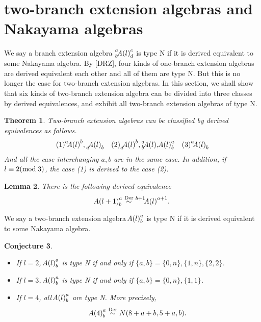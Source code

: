 \documentclass[a4paper, reqno]{amsart}
\newtheorem{thm}{Theorem}[section]
\newtheorem{conj}[thm]{Conjecture}
\newtheorem{lem}[thm]{Lemma}
\theoremstyle{definition}
\theoremstyle{remark}
\numberwithin{equation}{section}
\begin{document}
\section{two-branch extension algebras and Nakayama algebras}

We say a branch extension algebra ${\vphantom{A(l)}}^{a}_{b}\negmedspace{A(l)}^{c}_{d}$ is type N if it is derived equivalent to some Nakayama algebra. By [DRZ], four kinds of one-branch extension algebras are derived equivalent each other and all of them are type N. But this is no longer the case for two-branch extension algebras. In this section, we shall show that six kinds of two-branch extension algebra can be divided into three classes by derived equivalences, and exhibit all two-branch extension algebras of type N.
 
\begin{thm}
Two-branch extension algebras can be classified by derived equivalences as follows.
$$\begin{array}{lll}
(1) {\vphantom{A(l)}}^{a}\negmedspace{A(l)}^{b},{\vphantom{A(l)}}_{a}\negmedspace{A(l)}_{b} & (2) {\vphantom{A(l)}}_{a}\negmedspace{A(l)}^{b},{\vphantom{A(l)}}^{a}_{b}\negmedspace{A(l)},{\vphantom{A(l)}}\negmedspace{A(l)}^{a}_{b} & (3) {\vphantom{A(l)}}^{a}\negmedspace{A(l)}_{b}
\end{array}$$
And all the case interchanging $a,b$ are in the same case. In addition, if $l\equiv2(\textup{mod}\;3)$, the case (1) is derived to the case (2).
\end{thm}

\begin{lem}\label{2to3}
There is the following derived equivalence
$${\vphantom{A(l+1)}}\negmedspace{A(l+1)}^{a}_{b}\overset{\textup{Der}}{\sim}{\vphantom{A(l)}}^{b+1}\negmedspace{A(l)}^{a+1}.$$
\end{lem}

We say a two-branch extension algebra ${\vphantom{A(l)}}\negmedspace{A(l)}^{a}_{b}$ is type N if it is derived equivalent to some Nakayama algebra.

\begin{conj}
\begin{itemize}
\item[(1)] If $l=2$, ${\vphantom{A(l)}}\negmedspace{A(l)}^{a}_{b}$ is type N if and only if $\{a,b\}=\{0,n\},\{1,n\},\{2,2\}$.
\item[(2)] If $l=3$, ${\vphantom{A(l)}}\negmedspace{A(l)}^{a}_{b}$ is type N if and only if $\{a,b\}=\{0,n\},\{1,1\}$.
\item[(3)] If $l=4$, all ${\vphantom{A(l)}}\negmedspace{A(l)}^{a}_{b}$ are type N. More precisely, $${\vphantom{A(4)}}\negmedspace{A(4)}^{a}_{b}\overset{\textup{Der}}{\sim}N(8+a+b,5+a,b).$$
\end{itemize}
\end{conj}
\end{document}

